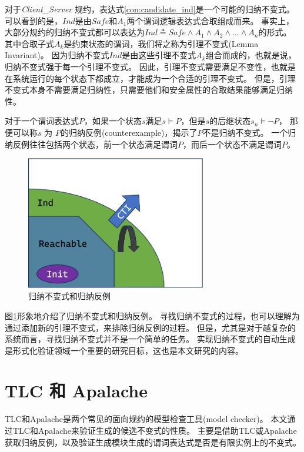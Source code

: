 对于\textit{Client\_Server} 规约，表达式\ref{con:candidate_ind}是一个可能的归纳不变式。
可以看到的是，$Ind$是由$Safe$和$A_{1}$两个谓词逻辑表达式合取组成而来。
事实上，大部分规约的归纳不变式都可以表达为$Ind \triangleq Safe \wedge A_1 \wedge A_2 \wedge... \wedge A_n$的形式。
其中合取子式$A_k$是约束状态的谓词，我们将之称为引理不变式(Lemma Invariant)。
因为归纳不变式$Ind$是由这些引理不变式$A_k$组合而成的，也就是说，归纳不变式强于每一个引理不变式。
因此，引理不变式需要满足不变性，也就是在系统运行的每个状态下都成立，才能成为一个合适的引理不变式。
但是，引理不变式本身不需要满足归纳性，只需要他们和安全属性的合取结果能够满足归纳性。

对于一个谓词表达式$P$，如果一个状态$s$满足$s \models P$，但是$s$的后继状态$s_{n} \models \neg P$，
那便可以称$s$ 为 $P$的归纳反例(counterexample)，揭示了$P$不是归纳不变式。
一个归纳反例往往包括两个状态，前一个状态满足谓词$P$，而后一个状态不满足谓词$P$。

\begin{figure}
    \centering
    \includegraphics[width=0.7\textwidth]{figures/ind-cti.pdf}
    \caption{归纳不变式和归纳反例}
    \label{fig:ind-cti}
\end{figure}
图\ref{fig:ind-cti}形象地介绍了归纳不变式和归纳反例。
寻找归纳不变式的过程，也可以理解为通过添加新的引理不变式，来排除归纳反例的过程。
但是，尤其是对于越复杂的系统而言，寻找归纳不变式并不是一个简单的任务。
实现归纳不变式的自动生成是形式化验证领域一个重要的研究目标，这也是本文研究的内容。

\section{TLC 和 Apalache}
TLC和Apalache是两个常见的面向\TLA 规约的模型检查工具(model checker)。
本文通过TLC和Apalache来验证生成的候选不变式的性质。
主要是借助TLC或Apalache获取归纳反例，以及验证生成模块生成的谓词表达式是否是有限实例上的不变式。

